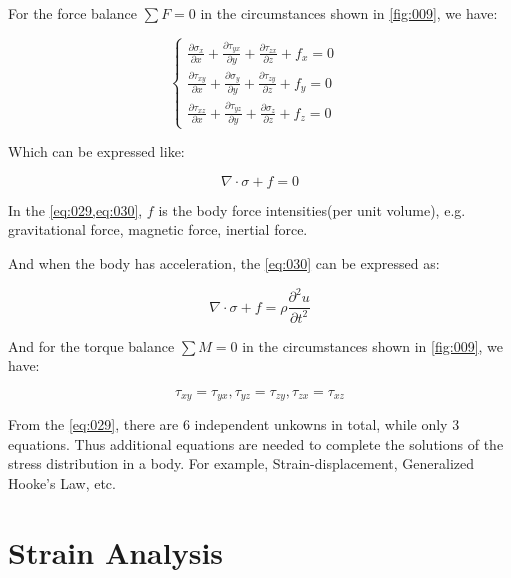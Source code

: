 \documentclass[en,hazy,cyan,8pt,normal]{elegantnote}
\numberwithin{equation}{section}
\begin{document}
    For the force balance $\sum F=0$ in the circumstances shown in \cref{fig:009}, we have:

    \begin{equation}\label{eq:029}
      \begin{cases}
        \displaystyle \frac{\partial\sigma_x}{\partial x}+\frac{\partial\tau_{yx}}{\partial y}+\frac{\partial\tau_{zx}}{\partial z}+f_x=0 \\
        \displaystyle \frac{\partial\tau_{xy}}{\partial x}+\frac{\partial\sigma_y}{\partial y}+\frac{\partial\tau_{zy}}{\partial z}+f_y=0 \\
        \displaystyle \frac{\partial\tau_{xz}}{\partial x}+\frac{\partial\tau_{yz}}{\partial y}+\frac{\partial\sigma_z}{\partial z}+f_z=0 &
      \end{cases}
    \end{equation}

    Which can be expressed like:

    \begin{equation}\label{eq:030}
      \nabla \cdot \sigma + f = 0
    \end{equation}

    In the \cref{eq:029,eq:030}, $f$ is the body force intensities(per unit volume), e.g. gravitational force, magnetic force, inertial force.

    And when the body has acceleration, the \cref{eq:030} can be expressed as:

    \begin{equation}\label{eq:031}
      \nabla \cdot \sigma + f = \rho \frac{\partial^2 u}{\partial t^2}
    \end{equation}

    And for the torque balance $\sum M=0$ in the circumstances shown in \cref{fig:009}, we have:

    \begin{equation}\label{eq:032}
        \tau_{xy}=\tau_{yx}, \tau_{yz}=\tau_{zy}, \tau_{zx}=\tau_{xz}
    \end{equation}

    From the \cref{eq:029}, there are 6 independent unkowns in total, while only 3 equations. Thus additional equations are needed to complete the solutions of the stress distribution in a body. For example, Strain-displacement, Generalized Hooke's Law, etc.

\section{Strain Analysis}
\end{document}
